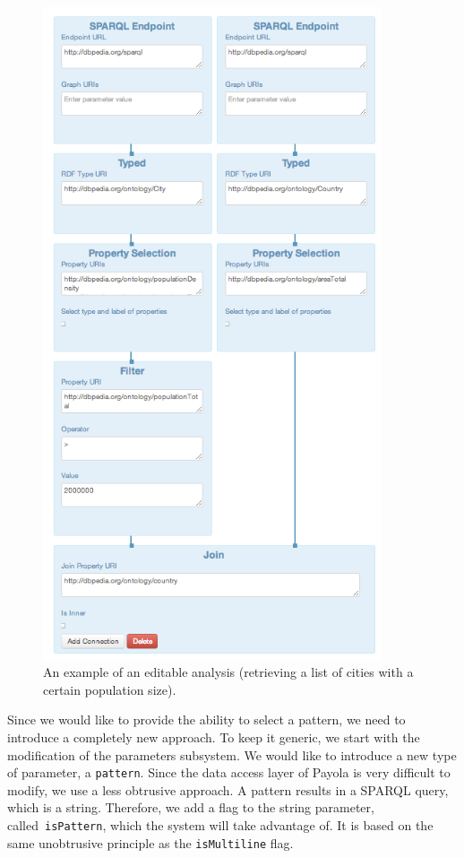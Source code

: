 \begin{figure}
  \centering
    \includegraphics[width=100mm]{img/editable-analysis.png}
  \caption{An example of an editable analysis (retrieving a list of cities with a certain population size).}
  \label{fig:example-analysis-editable}
\end{figure}

Since we would like to provide the ability to select a pattern, we need to 
introduce a completely new approach. To keep it generic, we start with the 
modification of the parameters subsystem. We would like to introduce a new type 
of parameter, a \texttt{pattern}. Since the data access layer of Payola is very 
difficult to modify, we use a less obtrusive approach. A pattern results in a 
SPARQL query, which is a string. Therefore, we add a flag to the string 
parameter, called~\texttt{isPattern}, which the system will take advantage of. It 
is based on the same unobtrusive principle as the \texttt{isMultiline} flag.

